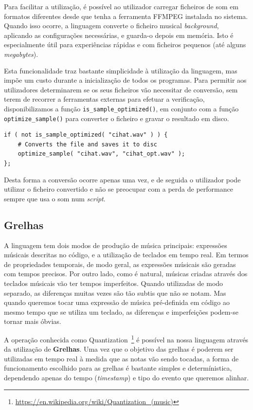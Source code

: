 Para facilitar a utilização, é possível ao utilizador carregar ficheiros de som em formatos diferentes desde que tenha a ferramenta FFMPEG instalada no sistema. Quando isso ocorre, a linguagem converte o ficheiro musical \textit{background}, aplicando as configurações necessárias, e guarda-o depois em memória. Isto é especialmente útil para experiências rápidas e com ficheiros pequenos (até alguns \textit{megabytes}).

Esta funcionalidade traz bastante simplicidade à utilização da linguagem, mas impõe um custo durante a inicialização de todos os programas. Para permitir aos utilizadores determinarem se os seus ficheiros vão necessitar de conversão, sem terem de recorrer a ferramentas externas para efetuar a verificação, disponibilizamos a função \texttt{is\_sample\_optimized()}, em conjunto com a função \texttt{optimize\_sample()} para converter o ficheiro e gravar o resultado em disco.

\begin{lstlisting}[caption={Verificar se um ficheiro de audio está optimizado, e convertê-lo caso contrário}]
if ( not is_sample_optimized( "cihat.wav" ) ) {
    # Converts the file and saves it to disc
    optimize_sample( "cihat.wav", "cihat_opt.wav" );
};
\end{lstlisting}

Desta forma a conversão ocorre apenas uma vez, e de seguida o utilizador pode utilizar o ficheiro convertido e não se preocupar com a perda de performance sempre que usa o som num \textit{script}.

\subsection{Grelhas}
A linguagem tem dois modos de produção de música principais: expressões músicais descritas no código, e a utilização de teclados em tempo real. Em termos de propriedades temporais, de modo geral, as expressões músicais são geradas com tempos precisos. Por outro lado, como é natural, músicas criadas através dos teclados músicais vão ter tempos imperfeitos. Quando utilizadas de modo separado, as diferenças muitas vezes são tão subtis que não se notam. Mas quando queremos tocar uma expressão de música pré-definida em código ao mesmo tempo que se utiliza um teclado, as diferenças e imperfeições podem-se tornar mais óbvias.

A operação conhecida como Quantization~\footnote{\url{https://en.wikipedia.org/wiki/Quantization_(music)}} é possível na nossa linguagem através da utilização de \textbf{Grelhas}. Uma vez que o objetivo das grelhas é poderem ser utilizadas em tempo real à medida que as notas vão sendo tocadas, a forma de funcionamento escolhido para as grelhas é bastante simples e determínistica, dependendo apenas do tempo (\textit{timestamp}) e tipo do evento que queremos alinhar.

